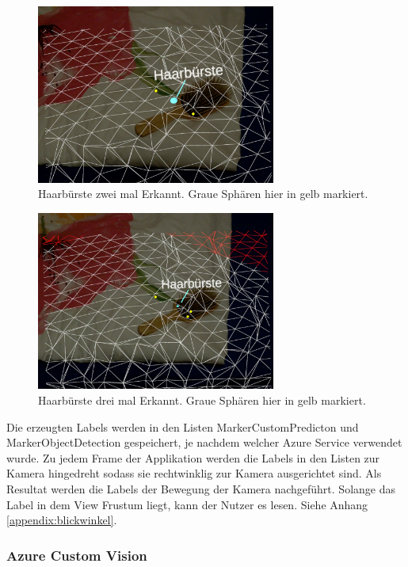 \begin{figure}[H]
	\centering
	\includegraphics[width=0.7\textwidth]{images/ML_multi1.jpg}
	\caption[Haarbürste zwei mal Erkannt]{Haarbürste zwei mal Erkannt. Graue Sphären hier in gelb markiert.}
	\label{image:multi1}
\end{figure}


\begin{figure}[H]
	\centering
	\includegraphics[width=0.7\textwidth]{images/ML_multi2.jpg}
	\caption[Haarbürste drei mal Erkannt]{Haarbürste drei mal Erkannt. Graue Sphären hier in gelb markiert.}
	\label{image:multi2}
\end{figure}

Die erzeugten Labels werden in den Listen MarkerCustomPredicton und MarkerObjectDetection gespeichert, je nachdem welcher Azure Service verwendet wurde. 
Zu jedem Frame der Applikation werden die Labels in den Listen zur Kamera hingedreht sodass sie rechtwinklig zur Kamera ausgerichtet sind. Als Resultat werden die Labels der Bewegung der Kamera nachgeführt. Solange das Label in dem View Frustum liegt, kann der Nutzer es lesen. Siehe Anhang \ref{appendix:blickwinkel}.

\subsubsection{Azure Custom Vision}

